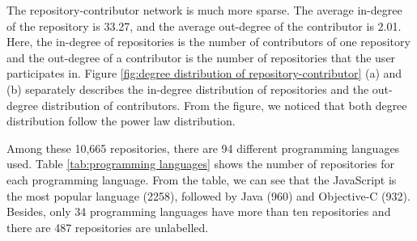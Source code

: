 \documentclass[12pt,oneside,final]{vlsithesis}
\begin{document}
The repository-contributor network is much more sparse. The average in-degree of the repository is 33.27, and the average out-degree of the contributor is 2.01. Here, the in-degree of repositories is the number of contributors of one repository and the out-degree of a contributor is the number of repositories that the user participates in.  Figure \ref{fig:degree distribution of repository-contributor} (a) and (b) separately describes the in-degree distribution of repositories and the out-degree distribution of contributors. From the figure, we noticed that both degree distribution follow the power law distribution.

Among these 10,665 repositories, there are 94 different programming languages used. Table \ref{tab:programming languages} shows the number of repositories for each programming language. From the table, we can see that the JavaScript is the most popular language (2258), followed by Java (960) and Objective-C (932). Besides, only 34 programming languages have more than ten repositories and there are 487 repositories are unlabelled. 
\end{document}
